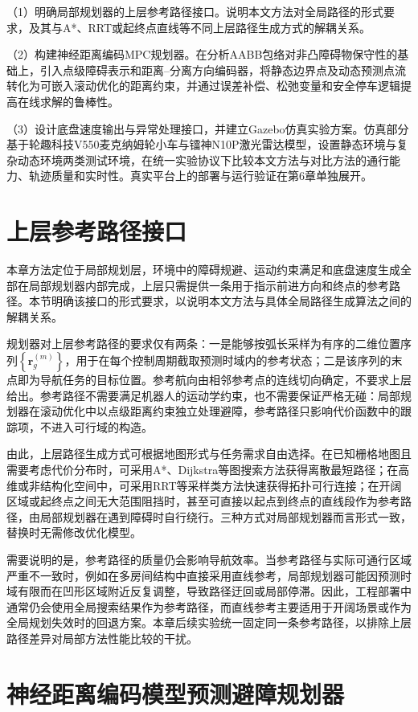 （1）明确局部规划器的上层参考路径接口。说明本文方法对全局路径的形式要求，及其与A*、RRT或起终点直线等不同上层路径生成方式的解耦关系。

（2）构建神经距离编码MPC规划器。在分析AABB包络对非凸障碍物保守性的基础上，引入点级障碍表示和距离--分离方向编码器，将静态边界点及动态预测点流转化为可嵌入滚动优化的距离约束，并通过误差补偿、松弛变量和安全停车逻辑提高在线求解的鲁棒性。

（3）设计底盘速度输出与异常处理接口，并建立Gazebo仿真实验方案。仿真部分基于轮趣科技V550麦克纳姆轮小车与镭神N10P激光雷达模型，设置静态环境与复杂动态环境两类测试环境，在统一实验协议下比较本文方法与对比方法的通行能力、轨迹质量和实时性。真实平台上的部署与运行验证在第6章单独展开。

\section{上层参考路径接口}
本章方法定位于局部规划层，环境中的障碍规避、运动约束满足和底盘速度生成全部在局部规划器内部完成，上层只需提供一条用于指示前进方向和终点的参考路径。本节明确该接口的形式要求，以说明本文方法与具体全局路径生成算法之间的解耦关系。

规划器对上层参考路径的要求仅有两条：一是能够按弧长采样为有序的二维位置序列$\left\{\mathbf{r}_g^{(m)}\right\}$，用于在每个控制周期截取预测时域内的参考状态；二是该序列的末点即为导航任务的目标位置。参考航向由相邻参考点的连线切向确定，不要求上层给出。参考路径不需要满足机器人的运动学约束，也不需要保证严格无碰：局部规划器在滚动优化中以点级距离约束独立处理避障，参考路径只影响代价函数中的跟踪项，不进入可行域的构造。

由此，上层路径生成方式可根据地图形式与任务需求自由选择。在已知栅格地图且需要考虑代价分布时，可采用A*、Dijkstra等图搜索方法获得离散最短路径；在高维或非结构化空间中，可采用RRT等采样类方法快速获得拓扑可行连接；在开阔区域或起终点之间无大范围阻挡时，甚至可直接以起点到终点的直线段作为参考路径，由局部规划器在遇到障碍时自行绕行。三种方式对局部规划器而言形式一致，替换时无需修改优化模型。

需要说明的是，参考路径的质量仍会影响导航效率。当参考路径与实际可通行区域严重不一致时，例如在多房间结构中直接采用直线参考，局部规划器可能因预测时域有限而在凹形区域附近反复调整，导致路径迂回或局部停滞。因此，工程部署中通常仍会使用全局搜索结果作为参考路径，而直线参考主要适用于开阔场景或作为全局规划失效时的回退方案。本章后续实验统一固定同一条参考路径，以排除上层路径差异对局部方法性能比较的干扰。


\section{神经距离编码模型预测避障规划器}
